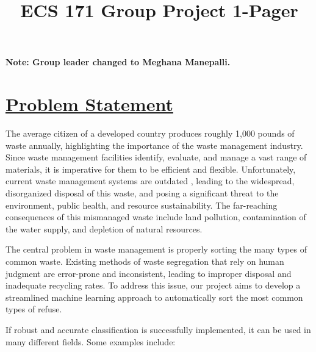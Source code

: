 \documentclass[conference]{IEEEtran}
\begin{document}
\title{\Huge ECS 171 Group Project 1-Pager}

\author{
  \centering
}

\maketitle

\textbf{Note: Group leader changed to Meghana Manepalli.}

\section{\underline{Problem Statement}}

The average citizen of a developed country produces roughly 1,000 pounds of waste annually, highlighting the importance of the waste management industry. Since waste management facilities identify, evaluate, and manage a vast range of materials, it is imperative for them to be efficient and flexible. Unfortunately, current waste management systems are outdated \cite{b1}, leading to the widespread, disorganized disposal of this waste, and posing a significant threat to the environment, public health, and resource sustainability. The far-reaching consequences of this mismanaged waste include land pollution, contamination of the water supply, and depletion of natural resources.

The central problem in waste management is properly sorting the many types of common waste. Existing methods of waste segregation that rely on human judgment are error-prone and inconsistent, leading to improper disposal and inadequate recycling rates. To address this issue, our project aims to develop a streamlined machine learning approach to automatically sort the most common types of refuse. 

If robust and accurate classification is successfully implemented, it can be used in many different fields. Some examples include:
\end{document}
